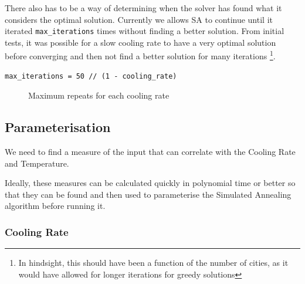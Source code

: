 \documentclass{article}
\begin{document}
There also has to be a way of determining when the solver has found what it considers the optimal solution.
Currently we allows SA to continue until it iterated \texttt{max\_iterations} times without finding a better solution.
From initial tests, it was possible for a slow cooling rate to have a very optimal solution before converging and then not find a better solution for many iterations \footnote{In hindsight, this should have been a function of the number of cities, as it would have allowed for longer iterations for greedy solutions}.

\begin{verbatim}
max_iterations = 50 // (1 - cooling_rate)
\end{verbatim}

\begin{figure}[H]
    \centering
    \caption{Maximum repeats for each cooling rate}
\end{figure}

\subsection{Parameterisation}

We need to find a measure of the input that can correlate with the Cooling Rate and Temperature.

Ideally, these measures can be calculated quickly in polynomial time or better so that they can be found and then used to parameterise the Simulated Annealing algorithm before running it.

\subsubsection{Cooling Rate}
\end{document}
